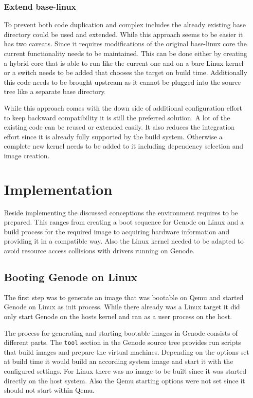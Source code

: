 \documentclass[
a4paper,
12pt,
notitlepage,
parskip=half,
DIV=11,
]{scrbook}
\begin{document}
		\subsection{Extend base-linux}
		To prevent both code duplication and complex includes the already existing base directory could be used and extended.
		While this approach seems to be easier it has two caveats.
		Since it requires modifications of the original base-linux core the current functionality needs to be maintained.
		This can be done either by creating a hybrid core that is able to run like the current one and on a bare Linux kernel or a switch needs to be added that chooses the target on build time.
		Additionally this code needs to be brought upstream as it cannot be plugged into the source tree like a separate base directory.
		
		While this approach comes with the down side of additional configuration effort to keep backward compatibility it is still the preferred solution.
		A lot of the existing code can be reused or extended easily.
		It also reduces the integration effort since it is already fully supported by the build system.
		Otherwise a complete new kernel needs to be added to it including dependency selection and image creation.
	
	\chapter{Implementation}
		
		Beside implementing the discussed conceptions the environment requires to be prepared.
		This ranges from creating a boot sequence for Genode on Linux and a build process for the required image to acquiring hardware information and providing it in a compatible way.
		Also the Linux kernel needed to be adapted to avoid resource access collisions with drivers running on Genode.
		
		\section{Booting Genode on Linux}
		\label{init}
		
		The first step was to generate an image that was bootable on Qemu and started Genode on Linux as init process.
		While there already was a Linux target it did only start Genode on the hosts kernel and ran as a user process on the host.
		
		The process for generating and starting bootable images in Genode consists of different parts.
		The \texttt{tool} section in the Genode source tree provides run scripts that build images and prepare the virtual machines.
		Depending on the options set at build time it would build an according system image and start it with the configured settings.
		For Linux there was no image to be built since it was started directly on the host system.
		Also the Qemu starting options were not set since it should not start within Qemu. \citep{genode}
		
\end{document}
